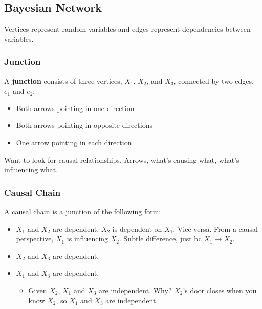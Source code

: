 \subsection{Bayesian Network}
\begin{definition}
    Vertices represent random variables and edges represent dependencies between variables.
\end{definition}

\subsubsection{Junction}
\begin{definition}
    A \textbf{junction} consists of three vertices, $X_1$, $X_2$, and $X_3$, connected by two edges, $e_1$ and $e_2$:
    \begin{itemize}
        \item Both arrows pointing in one direction
        \item Both arrows pointing in opposite directions
        \item One arrow pointing in each direction
    \end{itemize}
\end{definition}

\begin{warning}
    Want to look for causal relationships. 
    Arrows, what's causing what, what's influencing what.
\end{warning}

\subsubsection{Causal Chain}
\begin{definition}
    A causal chain is a junction of the following form:
    \begin{itemize}
        \item $X_1$ and $X_2$ are dependent. $X_2$ is dependent on $X_1$. Vice versa. From a causal perspective, $X_1$ is influencing $X_2$. Subtle difference, just bc $X_1 \rightarrow X_2$.
        \item $X_2$ and $X_3$ are dependent.
        \item $X_1$ and $X_3$ are dependent. 
        \begin{itemize}
            \item Given $X_2$, $X_1$ and $X_3$ are independent. Why? $X_2$'s door closes when you know $X_2$, so $X_1$ and $X_3$ are independent.
        \end{itemize}
    \end{itemize}
\end{definition}

